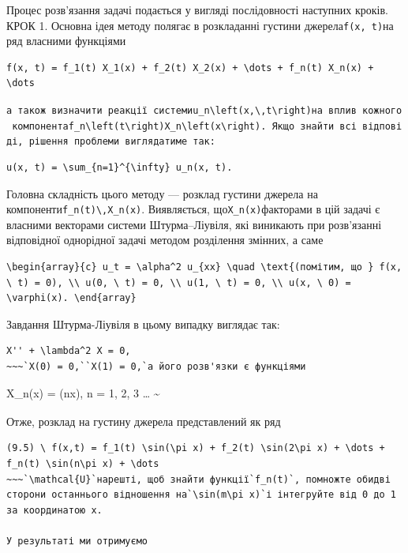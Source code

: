 \documentclass[
  ukrainian,
]{article}
\begin{document}
Процес розв'язання задачі подається у вигляді послідовності наступних
кроків. КРОК 1. Основна ідея методу полягає в розкладанні густини
джерела\texttt{f(x,\ t)}на ряд власними функціями

\begin{verbatim}
f(x, t) = f_1(t) X_1(x) + f_2(t) X_2(x) + \dots + f_n(t) X_n(x) + \dots
\end{verbatim}

\texttt{а\ також\ визначити\ реакції\ системи\textquotesingle{}u\_n\textbackslash{}left(x,\textbackslash{},t\textbackslash{}right)\textquotesingle{}на\ вплив\ кожного\ компонента\textquotesingle{}f\_n\textbackslash{}left(t\textbackslash{}right)X\_n\textbackslash{}left(x\textbackslash{}right)\textquotesingle{}.\ Якщо\ знайти\ всі\ відповіді,\ рішення\ проблеми\ виглядатиме\ так:}

\begin{verbatim}
u(x, t) = \sum_{n=1}^{\infty} u_n(x, t).
\end{verbatim}

Головна складність цього методу --- розклад густини джерела на
компоненти\texttt{f\_n(t)\textbackslash{},X\_n(x)}. Виявляється,
що\texttt{X\_n(x)}факторами в цій задачі є власними векторами системи
Штурма--Ліувіля, які виникають при розв'язанні відповідної однорідної
задачі методом розділення змінних, а саме

\begin{verbatim}
\begin{array}{c} u_t = \alpha^2 u_{xx} \quad \text{(помітим, що } f(x, \ t) = 0), \\ u(0, \ t) = 0, \\ u(1, \ t) = 0, \\ u(x, \ 0) = \varphi(x). \end{array}
\end{verbatim}

Завдання Штурма-Ліувіля в цьому випадку виглядає так:

\begin{verbatim}
X'' + \lambda^2 X = 0,
~~~`X(0) = 0,``X(1) = 0,`а його розв'язки є функціями
\end{verbatim}

X\_n(x) = \sin(n\pi x), \quad n = 1, 2, 3 \dots
\textsubscript{}\textasciitilde{}

Отже, розклад на густину джерела представлений як ряд

\begin{verbatim}
(9.5) \ f(x,t) = f_1(t) \sin(\pi x) + f_2(t) \sin(2\pi x) + \dots + f_n(t) \sin(n\pi x) + \dots
~~~`\mathcal{U}`нарешті, щоб знайти функції`f_n(t)`, помножте обидві сторони останнього відношення на`\sin(m\pi x)`і інтегруйте від 0 до 1 за координатою x.

У результаті ми отримуємо
\end{verbatim}
\end{document}
